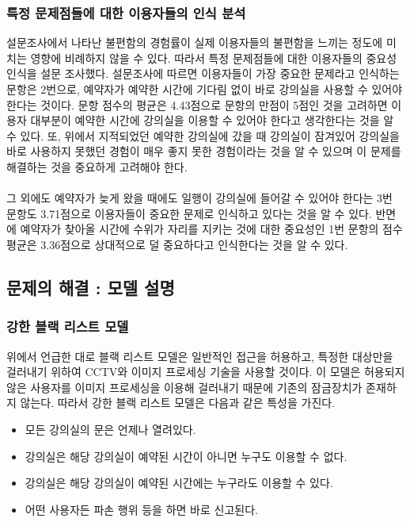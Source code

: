 \documentclass[11pt,a4paper]{article}
\begin{document}
\subsubsection{특정 문제점들에 대한 이용자들의 인식 분석}
설문조사에서 나타난 불편함의 경험률이 실제 이용자들의 불편함을 느끼는 정도에 미치는 영향에 비례하지 않을 수 있다. 따라서 특정 문제점들에 대한 이용자들의 중요성 인식을 설문 조사했다. 설문조사에 따르면 이용자들이 가장 중요한 문제라고 인식하는 문항은 2번으로, 예약자가 예약한 시간에 기다림 없이 바로 강의실을 사용할 수 있어야 한다는 것이다. 문항 점수의 평균은 4.43점으로 문항의 만점이 5점인 것을 고려하면 이용자 대부분이 예약한 시간에 강의실을 이용할 수 있어야 한다고 생각한다는 것을 알 수 있다. 또, 위에서 지적되었던 예약한 강의실에 갔을 때 강의실이 잠겨있어 강의실을 바로 사용하지 못했던 경험이 매우 좋지 못한 경험이라는 것을 알 수 있으며 이 문제를 해결하는 것을 중요하게 고려해야 한다.
\\
\\
그 외에도 예약자가 늦게 왔을 때에도 일행이 강의실에 들어갈 수 있어야 한다는 3번 문항도 3.71점으로 이용자들이 중요한 문제로 인식하고 있다는 것을 알 수 있다. 반면에 예약자가 찾아올 시간에 수위가 자리를 지키는 것에 대한 중요성인 1번 문항의 점수 평균은 3.36점으로 상대적으로 덜 중요하다고 인식한다는 것을 알 수 있다.

\subsection{문제의 해결 : 모델 설명}

\subsubsection{강한 블랙 리스트 모델}
위에서 언급한 대로 블랙 리스트 모델은 일반적인 접근을 허용하고, 특정한 대상만을 걸러내기 위하여 CCTV와 이미지 프로세싱 기술을 사용할 것이다. 이 모델은 허용되지 않은 사용자를 이미지 프로세싱을 이용해 걸러내기 때문에 기존의 잠금장치가 존재하지 않는다. 따라서 강한 블랙 리스트 모델은 다음과 같은 특성을 가진다.
\begin{itemize}
\item 모든 강의실의 문은 언제나 열려있다.
\item 강의실은 해당 강의실이 예약된 시간이 아니면 누구도 이용할 수 없다.
\item 강의실은 해당 강의실이 예약된 시간에는 누구라도 이용할 수 있다.
\item 어떤 사용자든 파손 행위 등을 하면 바로 신고된다.
\end{itemize}
\end{document}
